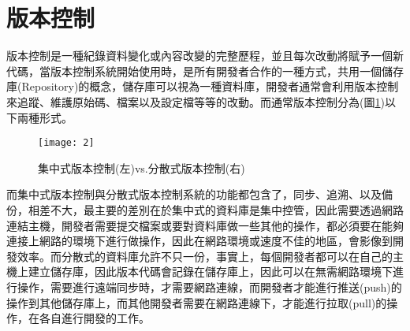 \renewcommand{\baselinestretch}{20} %
\section{版本控制}
\par
\renewcommand{\baselinestretch}{1} %
\twelve 版本控制是一種紀錄資料變化或內容改變的完整歷程，並且每次改動將賦予一個新代碼，當版本控制系統開始使用時，是所有開發者合作的一種方式，共用一個儲存庫(Repository)的概念，儲存庫可以視為一種資料庫，開發者通常會利用版本控制來追蹤、維護原始碼、檔案以及設定檔等等的改動。而通常版本控制分為(圖\ref{fig.版本控制})以下兩種形式。
\\
\par
\renewcommand{\baselinestretch}{1.7} %
\begin{figure}[hbt!]
\begin{center}
\texttt{[image: 2]}
\caption{\large 集中式版本控制(左)\enspace vs.分散式版本控制(右)}\label{fig.版本控制}
\end{center}
\end{figure}
\par
\renewcommand{\baselinestretch}{1} %
\twelve 而集中式版本控制與分散式版本控制系統的功能都包含了，同步、追溯、以及備份，相差不大，最主要的差別在於集中式的資料庫是集中控管，因此需要透過網路連結主機，開發者需要提交檔案或要對資料庫做一些其他的操作，都必須要在能夠連接上網路的環境下進行做操作，因此在網路環境或速度不佳的地區，會影像到開發效率。而分散式的資料庫允許不只一份，事實上，每個開發者都可以在自己的主機上建立儲存庫，因此版本代碼會記錄在儲存庫上，因此可以在無需網路環境下進行操作，需要進行遠端同步時，才需要網路連線，而開發者才能進行推送(push)的操作到其他儲存庫上，而其他開發者需要在網路連線下，才能進行拉取(pull)的操作，在各自進行開發的工作。
\par

\renewcommand{\baselinestretch}{20} %
